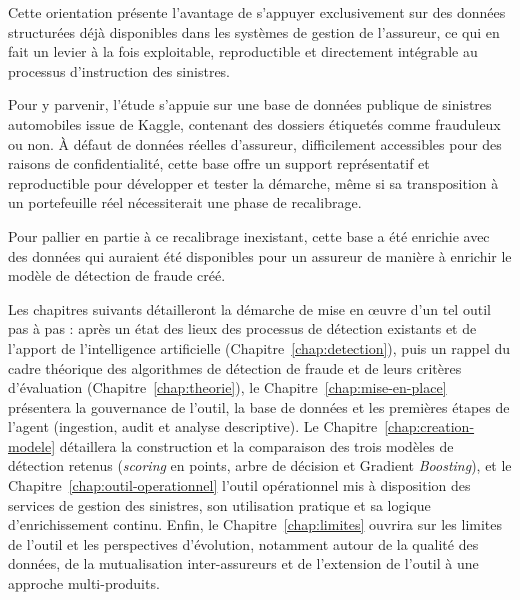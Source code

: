 Cette orientation présente l'avantage de s'appuyer exclusivement sur des données structurées déjà disponibles dans les systèmes de gestion de l'assureur, ce qui en fait un levier à la fois exploitable, reproductible et directement intégrable au processus d'instruction des sinistres.

Pour y parvenir, l'étude s'appuie sur une base de données publique de sinistres automobiles issue de Kaggle, contenant des dossiers étiquetés comme frauduleux ou non. À défaut de données réelles d'assureur, difficilement accessibles pour des raisons de confidentialité, cette base offre un support représentatif et reproductible pour développer et tester la démarche, même si sa transposition à un portefeuille réel nécessiterait une phase de recalibrage.

Pour pallier en partie à ce recalibrage inexistant, cette base a été enrichie avec des données qui auraient été disponibles pour un assureur de manière à enrichir le modèle de détection de fraude créé.

Les chapitres suivants détailleront la démarche de mise en œuvre d'un tel outil pas à pas : après un état des lieux des processus de détection existants et de l'apport de l'intelligence artificielle (Chapitre~\ref{chap:detection}), puis un rappel du cadre théorique des algorithmes de détection de fraude et de leurs critères d'évaluation (Chapitre~\ref{chap:theorie}), le Chapitre~\ref{chap:mise-en-place} présentera la gouvernance de l'outil, la base de données et les premières étapes de l'agent (ingestion, audit et analyse descriptive). Le Chapitre~\ref{chap:creation-modele} détaillera la construction et la comparaison des trois modèles de détection retenus (\textit{scoring} en points, arbre de décision et Gradient \textit{Boosting}), et le Chapitre~\ref{chap:outil-operationnel} l'outil opérationnel mis à disposition des services de gestion des sinistres, son utilisation pratique et sa logique d'enrichissement continu. Enfin, le Chapitre~\ref{chap:limites} ouvrira sur les limites de l'outil et les perspectives d'évolution, notamment autour de la qualité des données, de la mutualisation inter-assureurs et de l'extension de l'outil à une approche multi-produits.